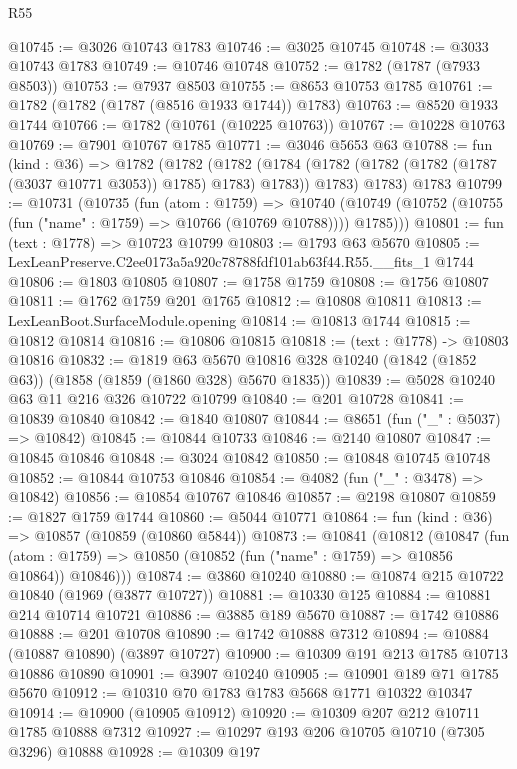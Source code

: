 \begin{lexlean}{R55}
\begin{coremodule}
@10745 := @3026 @10743 @1783
@10746 := @3025 @10745
@10748 := @3033 @10743 @1783
@10749 := @10746 @10748
@10752 := @1782 (@1787 (@7933 @8503))
@10753 := @7937 @8503
@10755 := @8653 @10753 @1785
@10761 := @1782 (@1782 (@1787 (@8516 @1933 @1744)) @1783)
@10763 := @8520 @1933 @1744
@10766 := @1782 (@10761 (@10225 @10763))
@10767 := @10228 @10763
@10769 := @7901 @10767 @1785
@10771 := @3046 @5653 @63
@10788 := fun (kind : @36) =>
  @1782
    (@1782
      (@1782 (@1784 (@1782 (@1782 (@1782 (@1787 (@3037 @10771 @3053)) @1785) @1783) @1783)) @1783)
      @1783)
    @1783
@10799 := @10731
    (@10735
      (fun (atom : @1759) =>
      @10740 (@10749 (@10752 (@10755 (fun ("name" : @1759) => @10766 (@10769 @10788)))) @1785)))
@10801 := fun (text : @1778) => @10723 @10799
@10803 := @1793 @63 @5670
@10805 := LexLeanPreserve.C2ee0173a5a920c78788fdf101ab63f44.R55.__fits_1 @1744
@10806 := @1803 @10805
@10807 := @1758 @1759
@10808 := @1756 @10807
@10811 := @1762 @1759 @201 @1765
@10812 := @10808 @10811
@10813 := LexLeanBoot.SurfaceModule.opening
@10814 := @10813 @1744
@10815 := @10812 @10814
@10816 := @10806 @10815
@10818 := (text : @1778) -> @10803 @10816
@10832 := @1819
    @63
    @5670
    @10816
    @328
    @10240
    (@1842 (@1852 @63))
    (@1858 (@1859 (@1860 @328) @5670 @1835))
@10839 := @5028 @10240 @63 @11 @216 @326 @10722 @10799
@10840 := @201 @10728
@10841 := @10839 @10840
@10842 := @1840 @10807
@10844 := @8651 (fun ("_" : @5037) => @10842)
@10845 := @10844 @10733
@10846 := @2140 @10807
@10847 := @10845 @10846
@10848 := @3024 @10842
@10850 := @10848 @10745 @10748
@10852 := @10844 @10753 @10846
@10854 := @4082 (fun ("_" : @3478) => @10842)
@10856 := @10854 @10767 @10846
@10857 := @2198 @10807
@10859 := @1827 @1759 @1744
@10860 := @5044 @10771
@10864 := fun (kind : @36) => @10857 (@10859 (@10860 @5844))
@10873 := @10841
    (@10812
      (@10847
        (fun (atom : @1759) => @10850 (@10852 (fun ("name" : @1759) => @10856 @10864)) @10846)))
@10874 := @3860 @10240
@10880 := @10874 @215 @10722 @10840 (@1969 (@3877 @10727))
@10881 := @10330 @125
@10884 := @10881 @214 @10714 @10721
@10886 := @3885 @189 @5670
@10887 := @1742 @10886
@10888 := @201 @10708
@10890 := @1742 @10888 @7312
@10894 := @10884 (@10887 @10890) (@3897 @10727)
@10900 := @10309 @191 @213 @1785 @10713 @10886 @10890
@10901 := @3907 @10240
@10905 := @10901 @189 @71 @1785 @5670
@10912 := @10310 @70 @1783 @1783 @5668 @1771 @10322 @10347
@10914 := @10900 (@10905 @10912)
@10920 := @10309 @207 @212 @10711 @1785 @10888 @7312
@10927 := @10297 @193 @206 @10705 @10710 (@7305 @3296) @10888
@10928 := @10309 @197

\end{coremodule}
\end{lexlean}

